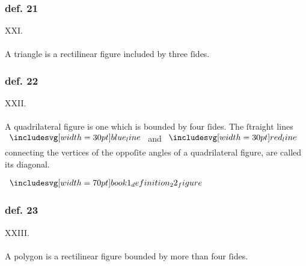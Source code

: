 \pagebreak

\begin{minipage}{0.67\textwidth}
    \subsubsection{def. 21}
    \begin{center}
        XXI.\label{book1def21}\\
        \hfill\\
        A triangle is a rectilinear figure included by three ſides.\\
    \end{center}
\end{minipage}%
\begin{minipage}{0.33\textwidth}
    \phantom{}
\end{minipage}

\hfill

\begin{minipage}{0.67\textwidth}
    \subsubsection{def. 22}
    \begin{center}
        XXII.\label{book1def22}\\
        \hfill\\
        A quadrilateral figure is one which is bounded by four ſides. The ſtraight lines $\blueline$ and $\redline$ connecting the vertices of the oppoſite angles of a quadrilateral figure, are called its diagonal.
    \end{center}
\end{minipage}%
\begin{minipage}{0.33\textwidth}
    \begin{center}
        $\img[0][0][70]{book1_definition_22_figure}$
    \end{center}
\end{minipage}

\hfill

\begin{minipage}{0.67\textwidth}
    \subsubsection{def. 23}
    \begin{center}
        XXIII.\label{book1def23}\\
        \hfill\\
        A polygon is a rectilinear figure bounded by more than four ſides.\\
    \end{center}
\end{minipage}%
\begin{minipage}{0.33\textwidth}
    \phantom{}
\end{minipage}


